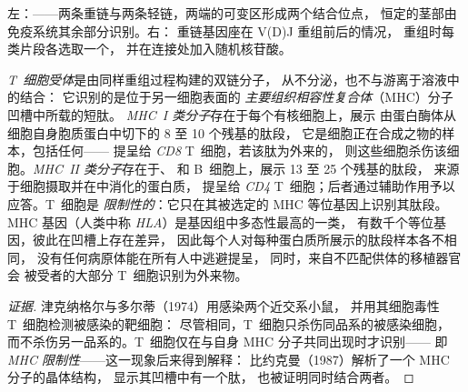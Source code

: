 \begin{omfigure}
{\small 左：——两条重链与两条轻链，两端的可变区形成两个结合位点，
恒定的茎部由免疫系统其余部分识别。右：
重链基因座在 V(D)J 重组前后的情况，
重组时每类片段各选取一个，
并在连接处加入随机核苷酸。}
\end{omfigure}

\begin{definition}\label{def:b3:adaptive-immunity:mhc}
\emph{T~细胞受体}是由同样重组过程构建的双链分子，
从不分泌，也不与游离于溶液中的结合：
它识别的是位于另一细胞表面的
\emph{主要组织相容性复合体}（MHC）分子凹槽中所载的短肽。
\emph{MHC~I 类分子}存在于每个有核细胞上，展示
由蛋白酶体从细胞自身胞质蛋白中切下的 8 至 10 个残基的肽段，
它是细胞正在合成之物的样本，包括任何——
提呈给 \emph{CD8} T~细胞，若该肽为外来的，
则这些细胞杀伤该细胞。\emph{MHC~II 类分子}存在于、
和 B~细胞上，展示 13 至 25 个残基的肽段，
来源于细胞摄取并在中消化的蛋白质，
提呈给 \emph{CD4} T~细胞；后者通过辅助作用予以应答。T~细胞是
\emph{限制性的}：它只在其被选定的 MHC 等位基因上识别其肽段。
MHC 基因（人类中称 \emph{HLA}）是基因组中多态性最高的一类，
有数千个等位基因，彼此在凹槽上存在差异，
因此每个人对每种蛋白质所展示的肽段样本各不相同，
没有任何病原体能在所有人中逃避提呈，
同时，来自不匹配供体的移植器官会
被受者的大部分 T~细胞识别为外来物。
\end{definition}

\begin{proof}[证据]
津克纳格尔与多尔蒂（1974）用感染两个近交系小鼠，
并用其细胞毒性 T~细胞检测被感染的靶细胞：
尽管相同，T~细胞只杀伤同品系的被感染细胞，
而不杀伤另一品系的。T~细胞仅在与自身 MHC 分子共同出现时才识别——
即 \emph{MHC 限制性}——这一现象后来得到解释：
比约克曼（1987）解析了一个 MHC 分子的晶体结构，
显示其凹槽中有一个肽，
也被证明同时结合两者。
\end{proof}

